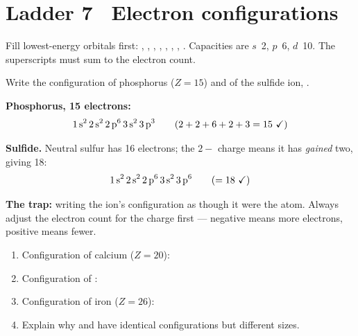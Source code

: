 \documentclass{apchem-worksheet}
\begin{document}
\section*{\sffamily Ladder 7 \textbullet\ Electron configurations}

Fill lowest-energy orbitals first: , , , ,
, , , . Capacities are $s$~2, $p$~6, $d$~10.
The superscripts must sum to the electron count.

\begin{workedexample}
Write the configuration of phosphorus ($Z = 15$) and of the sulfide ion,
.

\textbf{Phosphorus, 15 electrons:}
\[ \ce{1s^2 2s^2 2p^6 3s^2 3p^3} \qquad
   (2+2+6+2+3 = 15 \text{ \checkmark}) \]

\textbf{Sulfide.} Neutral sulfur has 16 electrons; the $2-$ charge means
it has \emph{gained} two, giving 18:
\[ \ce{1s^2 2s^2 2p^6 3s^2 3p^6} \qquad (=18 \text{ \checkmark}) \]

\textbf{The trap:} writing the ion's configuration as though it were the
atom. Always adjust the electron count for the charge first --- negative
means more electrons, positive means fewer.
\end{workedexample}

\begin{yourturn}
\begin{enumerate}[leftmargin=*,itemsep=0.5em]
  \item Configuration of calcium ($Z = 20$): \workspace[1.6cm]
  \item Configuration of : \workspace[1.6cm]
  \item Configuration of iron ($Z = 26$): \workspace[1.8cm]
  \item Explain why  and  have identical
        configurations but different sizes. \workspace[1.8cm]
\end{enumerate}
\end{yourturn}
\end{document}

